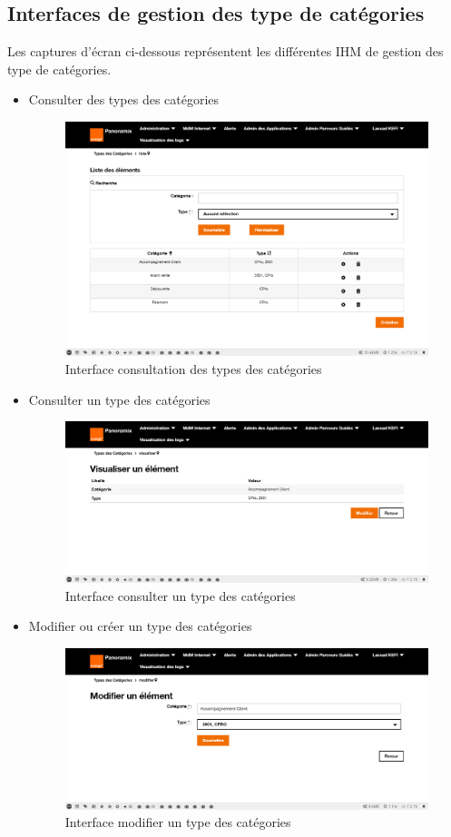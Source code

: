 \subsection{Interfaces de gestion des type de catégories}
Les captures d'écran ci-dessous représentent les différentes IHM de gestion des type de catégories.
\begin{itemize}
	\item Consulter des types des catégories
	\begin{figure}[H]
		\centering
		\includegraphics[width=0.6\linewidth]{img/screenshots/categorie-type/index}
		\caption[Interface consultation des types des catégories]{Interface consultation des types des catégories}
		\label{fig:index-tc}
	\end{figure}
	\newpage
	\item Consulter un type des catégories
	\begin{figure}[H]
		\centering
		\includegraphics[width=0.7\linewidth]{img/screenshots/categorie-type/view}
		\caption[Interface voir un type des catégories]{Interface consulter un type des catégories}
		\label{fig:view-tc}
	\end{figure}
	
	\item Modifier ou créer un type des catégories
	\begin{figure}[H]
		\centering
		\includegraphics[width=0.7\linewidth]{img/screenshots/categorie-type/create-edit}
		\caption[Interface modifier un type des catégories]{Interface modifier un type des catégories}
		\label{fig:edit-tc}
	\end{figure}


\end{itemize}
